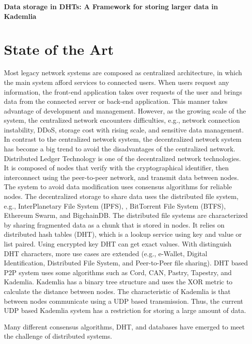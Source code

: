 \documentclass{article}
\begin{document}


{\huge  \textbf {Data storage in DHTs: A Framework for storing larger data in Kademlia}}\\
\section{State of the Art}
Most legacy network systems are composed as centralized architecture, in which the main system afford services to connected users. When users request any information, the front-end application takes over requests of the user and brings data from the connected server or back-end application. This manner takes advantage of development and management. However, as the growing scale of the system, the centralized network encounters difficulties, e.g., network connection instability, DDoS, storage cost with rising scale, and sensitive data management. In contrast to the centralized network system, the decentralized network system has become a big trend to avoid the disadvantages of the centralized network. 
Distributed Ledger Technology is one of the decentralized network technologies. It is composed of nodes that verify with the cryptographical identifier, then interconnect using the peer-to-peer network, and transmit data between nodes. The system to avoid data modification uses consensus algorithms for reliable nodes. The decentralized storage to share data uses the distributed file system, e.g., InterPlanetary File System (IPFS),  \cite{IPFS}\cite{benet2014ipfs}, BitTorrent File System (BTFS)\cite{BTFS}, Ethereum Swarm, and BigchainDB. The distributed file systems are characterized by sharing fragmented data as a chunk that is stored in nodes. It relies on distributed hash tables (DHT)\cite{sivaraja2008efficient}, which is a lookup service using key and value or list paired. Using encrypted key DHT can get exact values. With distinguish DHT characters, more use cases are extended (e.g., e-Wallet, Digital Identification, Distributed File System, and Peer-to-Peer file sharing). DHT based P2P system uses some algorithms such as Cord, CAN, Pastry, Tapestry, and Kademlia. Kademlia has a binary tree structure and uses the XOR metric to calculate the distance between nodes. The characteristic of Kademlia is that between nodes communicate using a UDP based transmission. Thus, the current UDP based Kademlia system has a restriction for storing a large amount of data. 

Many different consensus algorithms, DHT, and databases have emerged to meet the challenge of distributed systems.
\end{document}
